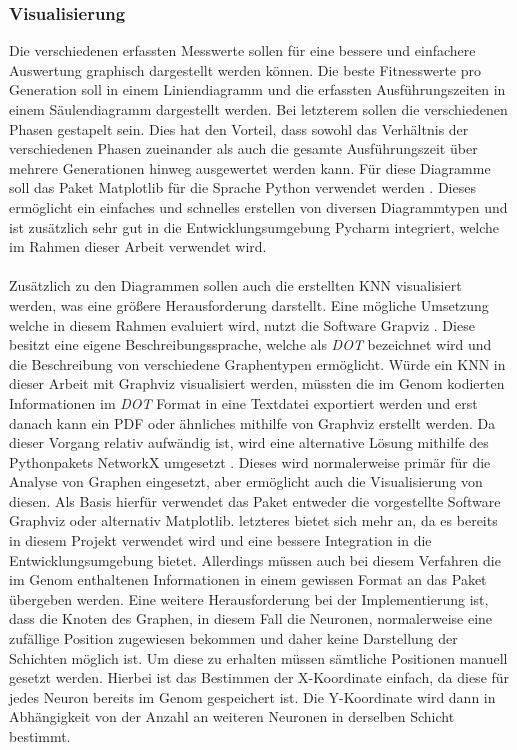 \subsubsection{Visualisierung}
Die verschiedenen erfassten Messwerte sollen für eine bessere und einfachere Auswertung graphisch dargestellt werden können. Die beste Fitnesswerte pro Generation soll in einem Liniendiagramm und die erfassten Ausführungszeiten in einem Säulendiagramm dargestellt werden. Bei letzterem sollen die verschiedenen Phasen gestapelt sein. Dies hat den Vorteil, dass sowohl das Verhältnis der verschiedenen Phasen zueinander als auch die gesamte Ausführungszeit über mehrere Generationen hinweg ausgewertet werden kann. Für diese Diagramme soll das Paket Matplotlib für die Sprache Python verwendet werden \cite{pyplot2007hunter}. Dieses ermöglicht ein einfaches und schnelles erstellen von diversen Diagrammtypen und ist zusätzlich sehr gut in die Entwicklungsumgebung Pycharm integriert, welche im Rahmen dieser Arbeit verwendet wird.
\\\\
Zusätzlich zu den Diagrammen sollen auch die erstellten \ac{KNN} visualisiert werden, was eine größere Herausforderung darstellt. Eine mögliche Umsetzung welche in diesem Rahmen evaluiert wird, nutzt die Software Grapviz \cite{graphviz2000gansner}. Diese besitzt eine eigene Beschreibungssprache, welche als \emph{DOT} bezeichnet wird und die Beschreibung von verschiedene Graphentypen ermöglicht. Würde ein \ac{KNN} in dieser Arbeit mit Graphviz visualisiert werden, müssten die im  Genom kodierten Informationen  im \emph{DOT} Format in eine Textdatei exportiert werden und erst danach kann ein PDF oder ähnliches mithilfe von Graphviz erstellt werden. Da dieser Vorgang relativ aufwändig ist, wird eine alternative Lösung mithilfe des Pythonpakets NetworkX umgesetzt \cite{networkx2008hagberg}. Dieses wird normalerweise primär für die Analyse von Graphen eingesetzt, aber ermöglicht auch die Visualisierung von diesen. Als Basis hierfür verwendet das Paket entweder die vorgestellte Software Graphviz oder alternativ Matplotlib. 
letzteres bietet sich mehr an, da es bereits in diesem Projekt verwendet wird und eine bessere Integration in die Entwicklungsumgebung bietet. Allerdings müssen auch bei diesem Verfahren die im Genom enthaltenen Informationen in einem gewissen Format an das Paket übergeben werden. Eine weitere Herausforderung bei der Implementierung ist, dass die Knoten des Graphen, in diesem Fall die Neuronen, normalerweise eine zufällige Position zugewiesen bekommen und daher keine Darstellung der Schichten möglich ist. Um diese zu erhalten müssen sämtliche Positionen manuell gesetzt werden. Hierbei ist das Bestimmen der X-Koordinate einfach, da diese für jedes Neuron bereits im Genom gespeichert ist. Die Y-Koordinate wird dann in Abhängigkeit von der Anzahl an weiteren Neuronen in derselben Schicht bestimmt.    

